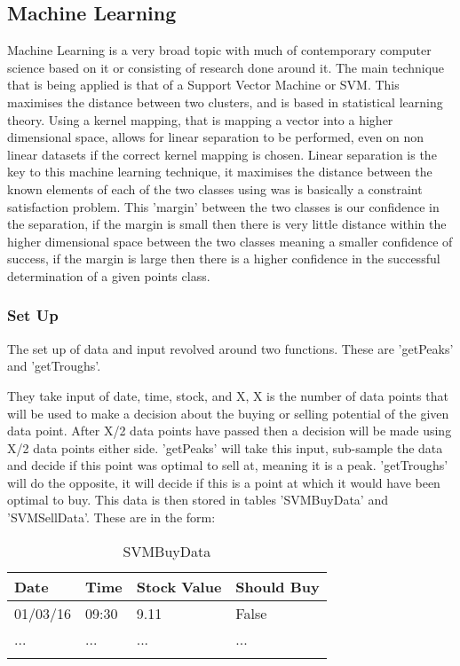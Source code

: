 \documentclass[12pt,a4paper]{article}
\begin{document}
\iffalse
#################################################################################
\fi

\subsection*{Machine Learning}

Machine Learning is a very broad topic with much of contemporary computer science based on it or consisting of research done around it. The main technique that is being applied is that of a Support Vector Machine or SVM. This maximises the distance between two clusters, and is based in statistical learning theory. Using a kernel mapping, that is mapping a vector into a higher dimensional space, allows for linear separation to be performed, even on non linear datasets if the correct kernel mapping is chosen. Linear separation is the key to this machine learning technique, it maximises the distance between the known elements of each of the two classes using was is basically a constraint satisfaction problem. This 'margin' between the two classes is our confidence in the separation, if the margin is small then there is very little distance within the higher dimensional space between the two classes meaning a smaller confidence of success, if the margin is large then there is a higher confidence in the successful determination of a given points class. 

\subsubsection*{Set Up}

The set up of data and input revolved around two functions. These are 'getPeaks' and 'getTroughs'.

They take input of date, time, stock, and X, X is the number of data points that will be used to make a decision about the buying or selling potential of the given data point. After X/2 data points have passed then a decision will be made using X/2 data points either side. 'getPeaks' will take this input, sub-sample the data and decide if this point was optimal to sell at, meaning it is a peak. 'getTroughs' will do the opposite, it will decide if this is a point at which it would have been optimal to buy. This data is then stored in tables 'SVMBuyData' and 'SVMSellData'. These are in the form:

\label{units}
\begin{longtable}{ |p{2.25cm}|p{2.25cm}|p{2.25cm}|p{2.25cm}| }\hline\hline
Date & Time & Stock Value & Should Buy \\ \hline
01/03/16 & 09:30 & 9.11 & False  \\ \hline
... & ... & ... & ...  \\ \hline
\caption{SVMBuyData}
\end{longtable}
\end{document}

